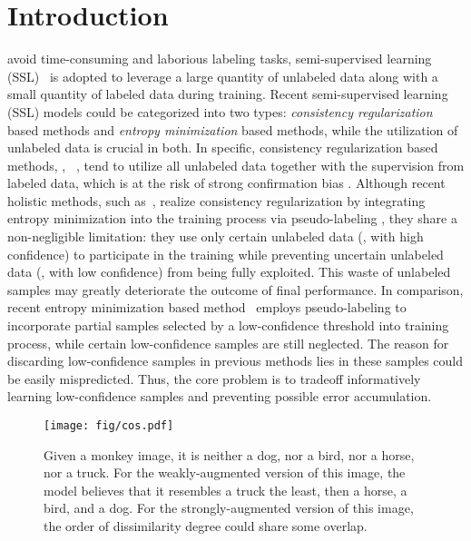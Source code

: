 \documentclass[lettersize,journal]{IEEEtran}
\theoremstyle{plain}
\theoremstyle{definition}
\theoremstyle{remark}
\begin{document}
\section{Introduction}
\label{sec:intro}
 avoid time-consuming and laborious labeling tasks, semi-supervised learning (SSL)~\cite{zhu2009introduction,chapelle2009semi,zhu2017semi,van2020survey}
is adopted to leverage a large quantity of unlabeled data along with a small quantity of labeled data during training. 
Recent semi-supervised learning (SSL) models could be categorized into two types: \textit{consistency regularization} based methods and \textit{entropy minimization} based methods, while the utilization of unlabeled data is crucial in both. In specific, consistency regularization based methods, \eg, ~\cite{laine2016temporal,tarvainen2017mean}, tend to utilize all unlabeled data together with the supervision from labeled data, which is at the risk of strong confirmation bias \cite{yu2018learning}. Although recent holistic methods, such as~\cite{sohn2020fixmatch,xu2021dash}, realize consistency regularization by integrating entropy minimization into the training process via pseudo-labeling \cite{lee2013pseudo}, they share a non-negligible limitation: they use only certain unlabeled data (\ie, with high confidence) to participate in the training while
preventing uncertain unlabeled data (\ie, with low confidence) from being fully exploited.
This waste of unlabeled samples may greatly deteriorate the outcome of final performance. In comparison, recent entropy minimization based method~\cite{rizve2021in} employs pseudo-labeling to incorporate partial samples selected by a low-confidence threshold into training process, while 
certain low-confidence samples are still neglected. 
The reason for discarding low-confidence samples in previous methods lies in these samples could be easily mispredicted. Thus,  the core problem is to tradeoff informatively learning low-confidence samples and preventing possible error accumulation.
\begin{figure}
   \centering
   \texttt{[image: fig/cos.pdf]}
\caption{Given a monkey image, it is neither a dog, nor a bird, nor a horse, nor a truck. For the weakly-augmented version of this image, the model believes that it resembles a truck the least, then a horse, a bird, and a dog. For the strongly-augmented version of this image, 
   the order of dissimilarity degree could share some overlap.}
   \label{ex_fig}  
\end{figure}
\end{document}

